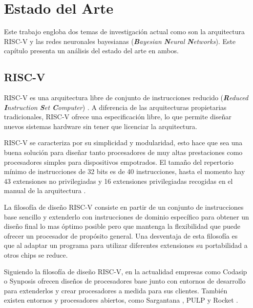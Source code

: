 \chapter{Estado del Arte}

Este trabajo engloba dos temas de investigación actual como son la
arquitectura RISC-V y las redes neuronales bayesianas (\textit{\textbf{B}ayesian \textbf{N}eural \textbf{N}etworks}). Este capítulo presenta un análisis del estado del arte en ambos.

\section{RISC-V}

RISC-V es una arquitectura libre de conjunto de instrucciones reducido (\textit{\textbf{R}educed \textbf{I}nstruction \textbf{S}et \textbf{C}omputer}) \cite{ricv_org}. A diferencia de las arquitecturas propietarias tradicionales, RISC-V ofrece una especificación libre, lo que permite diseñar nuevos sistemas hardware sin tener que licenciar la arquitectura.


RISC-V se caracteriza por su simplicidad y modularidad, esto hace que sea una buena solución para diseñar tanto procesadores de muy altas prestaciones como procesadores simples para dispositivos empotrados. El tamaño del repertorio mínimo de instrucciones de 32 bits es de 40 instrucciones, hasta el momento hay 43 extensiones no privilegiadas y 16 extensiones privilegiadas recogidas en el manual de la arquitectura \cite{riscv_scpec_unpriv, riscv_scpec_priv}.

La filosofía de diseño RISC-V consiste en partir de un conjunto de instrucciones base sencillo y extenderlo con instrucciones de dominio específico para obtener un diseño final lo mas óptimo posible pero que mantenga la flexibilidad que puede ofrecer un procesador de propósito general. Una desventaja de esta filosofía es que al adaptar un programa para utilizar diferentes extensiones su portabilidad a otros chips se reduce.

Siguiendo la filosofía de diseño RISC-V, en la actualidad empresas como Codasip \cite{codasip} o Synposis \cite{synopsis} ofrecen diseños de procesadores base junto con entornos de desarrollo para extenderlos y crear procesadores a medida para sus clientes. También existen entornos y procesadores abiertos, como Sargantana \cite{riscv_sargantana}, PULP \cite{riscv_pulp} y Rocket \cite{riscv_rocket}.

